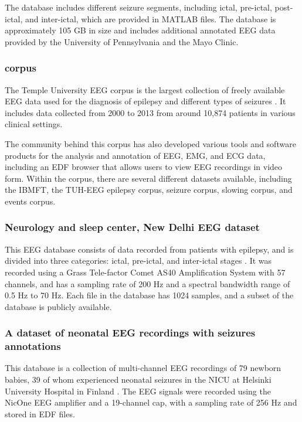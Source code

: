 The database includes different seizure segments, including ictal, pre-ictal, post-ictal, and inter-ictal, which are provided in MATLAB files. The database is approximately 105 GB in size and includes additional annotated \gls{EEG} data provided by the University of Pennsylvania and the Mayo Clinic.

\subsubsection{ corpus}
The Temple University \gls{EEG} corpus is the largest collection of freely available \gls{EEG} data used for the diagnosis of epilepsy and different types of seizures \cite{obeid_temple_2016}. It includes data collected from 2000 to 2013 from around 10,874 patients in various clinical settings. 

The community behind this corpus has also developed various tools and software products for the analysis and annotation of \gls{EEG}, \gls{EMG}, and \gls{ECG} data, including an \gls{EDF} browser that allows users to view \gls{EEG} recordings in video form. Within the corpus, there are several different datasets available, including the \gls{IBMFT}, the \gls{TUH-EEG} epilepsy corpus, seizure corpus, slowing corpus, and events corpus.

\subsubsection{Neurology and sleep center, New Delhi EEG dataset}
This \gls{EEG} database consists of data recorded from patients with epilepsy, and is divided into three categories: ictal, pre-ictal, and inter-ictal stages \cite{swami_eeg_2016}. It was recorded using a Grass Tele-factor Comet AS40 Amplification System with 57 channels, and has a sampling rate of 200 Hz and a spectral bandwidth range of 0.5 Hz to 70 Hz. Each file in the database has 1024 samples, and a subset of the database is publicly available.

\subsubsection{A dataset of neonatal EEG recordings with seizures annotations}
This database is a collection of multi-channel \gls{EEG} recordings of 79 newborn babies, 39 of whom experienced neonatal seizures in the \gls{NICU} at Helsinki University Hospital in Finland \cite{stevenson_dataset_2018}. The \gls{EEG} signals were recorded using the NicOne \gls{EEG} amplifier and a 19-channel cap, with a sampling rate of 256 Hz and stored in \gls{EDF} files. 

